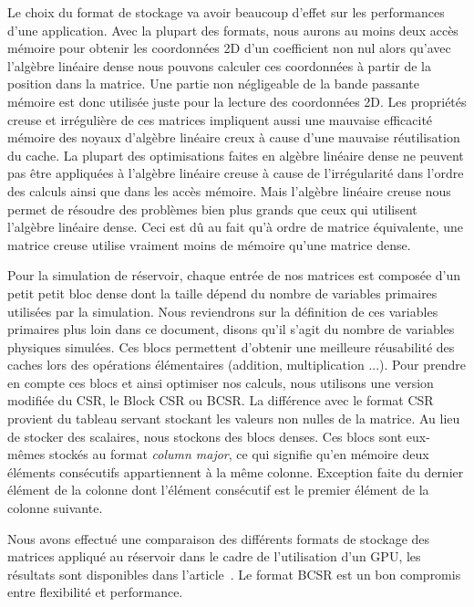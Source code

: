 Le choix du format de stockage va avoir beaucoup d'effet sur les performances d'une application.
%
Avec la plupart des formats, nous aurons au moins deux accès mémoire pour obtenir les coordonnées 2D d'un coefficient non nul alors qu'avec l'algèbre linéaire dense nous pouvons calculer ces coordonnées à partir de la position dans la matrice.
%
Une partie non négligeable de la bande passante mémoire est donc utilisée juste pour la lecture des coordonnées 2D.
%
Les propriétés creuse et irrégulière de ces matrices impliquent aussi une mauvaise efficacité mémoire des noyaux d'algèbre linéaire creux à cause d'une mauvaise réutilisation du cache.
%
La plupart des optimisations faites en algèbre linéaire dense ne peuvent pas être appliquées à l'algèbre linéaire creuse à cause de l'irrégularité dans l'ordre des calculs ainsi que dans les accès mémoire.
%
Mais l'algèbre linéaire creuse nous permet de résoudre des problèmes bien plus grands que ceux qui utilisent l'algèbre linéaire dense.
%
Ceci est dû au fait qu'à ordre de matrice équivalente, une matrice creuse utilise vraiment moins de mémoire qu'une matrice dense.


Pour la simulation de réservoir, chaque entrée de nos matrices est composée d'un petit petit bloc dense dont la taille dépend du nombre de variables primaires utilisées par la simulation.
%
Nous reviendrons sur la définition de ces variables primaires plus loin dans ce document, disons qu'il s'agit du nombre de variables physiques simulées.
%
Ces blocs permettent d'obtenir une meilleure réusabilité des caches lors des opérations élémentaires (addition, multiplication ...).
%
Pour prendre en compte ces blocs et ainsi optimiser nos calculs, nous utilisons une version modifiée du CSR, le Block CSR ou BCSR.
%
La différence avec le format CSR provient du tableau servant stockant les valeurs non nulles de la matrice.
%
Au lieu de stocker des scalaires, nous stockons des blocs denses.
%
Ces blocs sont eux-mêmes stockés au format {\em column major}, ce qui signifie qu'en mémoire deux éléments consécutifs appartiennent à la même colonne.
%
Exception faite du dernier élément de la colonne dont l'élément consécutif est le premier élément de la colonne suivante.


Nous avons effectué une comparaison des différents formats de stockage des matrices appliqué au réservoir dans le cadre de l'utilisation d'un GPU, les résultats sont disponibles dans l'article~\cite{Renpar}.
%
Le format BCSR est un bon compromis entre flexibilité et performance.

